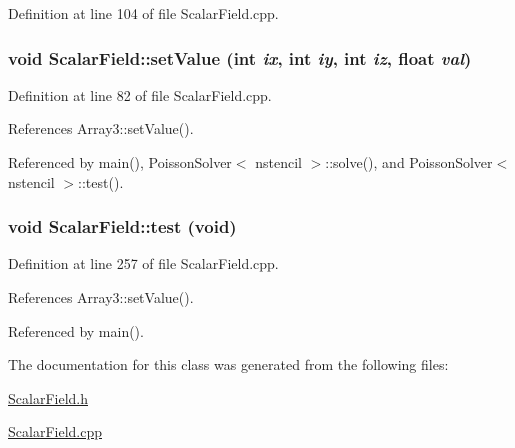 Definition at line 104 of file ScalarField.cpp.

\subsubsection[{setValue}]{\setlength{\rightskip}{0pt plus 5cm}void ScalarField::setValue (int {\em ix}, \/  int {\em iy}, \/  int {\em iz}, \/  float {\em val})}\label{classScalarField_a9627dfa6d889495e9878b908df64951d}


Definition at line 82 of file ScalarField.cpp.



References Array3::setValue().



Referenced by main(), PoissonSolver$<$ nstencil $>$::solve(), and PoissonSolver$<$ nstencil $>$::test().

\subsubsection[{test}]{\setlength{\rightskip}{0pt plus 5cm}void ScalarField::test (void)}\label{classScalarField_a1edabc01b69868134bef0442e6cb7209}


Definition at line 257 of file ScalarField.cpp.



References Array3::setValue().



Referenced by main().



The documentation for this class was generated from the following files:\begin{DoxyCompactItemize}
\item 
\hyperlink{ScalarField_8h}{ScalarField.h}\item 
\hyperlink{ScalarField_8cpp}{ScalarField.cpp}\end{DoxyCompactItemize}
